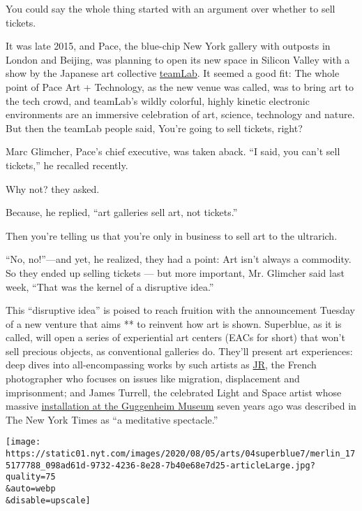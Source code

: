 You could say the whole thing started with an argument over whether to
sell tickets.

It was late 2015, and Pace, the blue-chip New York gallery with outposts
in London and Beijing, was planning to open its new space in Silicon
Valley with a show by the Japanese art collective
\href{https://www.nytimes.com/2016/02/04/t-magazine/art/teamlab-living-digital-space-future-parks-pace-gallery-california.html}{teamLab}.
It seemed a good fit: The whole point of Pace Art + Technology, as the
new venue was called, was to bring art to the tech crowd, and teamLab's
wildly colorful, highly kinetic electronic environments are an immersive
celebration of art, science, technology and nature. But then the teamLab
people said, You're going to sell tickets, right?

Marc Glimcher, Pace's chief executive, was taken aback. ``I said, you
can't sell tickets,'' he recalled recently.

Why not? they asked.

Because, he replied, ``art galleries sell art, not tickets.''

Then you're telling us that you're only in business to sell art to the
ultrarich.

``No, no!''---and yet, he realized, they had a point: Art isn't always a
commodity. So they ended up selling tickets --- but more important, Mr.
Glimcher said last week, ``That was the kernel of a disruptive idea.''

This ``disruptive idea'' is poised to reach fruition with the
announcement Tuesday of a new venture that aims ** to reinvent how art
is shown. Superblue, as it is called, will open a series of experiential
art centers (EACs for short) that won't sell precious objects, as
conventional galleries do. They'll present art experiences: deep dives
into all-encompassing works by such artists as
\href{https://www.nytimes.com/2014/09/25/arts/design/jr-brings-ellis-islands-abandoned-hospital-to-life.html}{JR},
the French photographer who focuses on issues like migration,
displacement and imprisonment; and James Turrell, the celebrated Light
and Space artist whose massive
\href{https://www.nytimes.com/2013/06/21/arts/design/james-turrell-plays-with-color-at-the-guggenheim.html}{installation
at the Guggenheim Museum} seven years ago was described in The New York
Times as ``a meditative spectacle.''

\texttt{[image: https://static01.nyt.com/images/2020/08/05/arts/04superblue7/merlin\_175177788\_098ad61d-9732-4236-8e28-7b40e68e7d25-articleLarge.jpg?quality=75\\\&auto=webp\\\&disable=upscale]}

